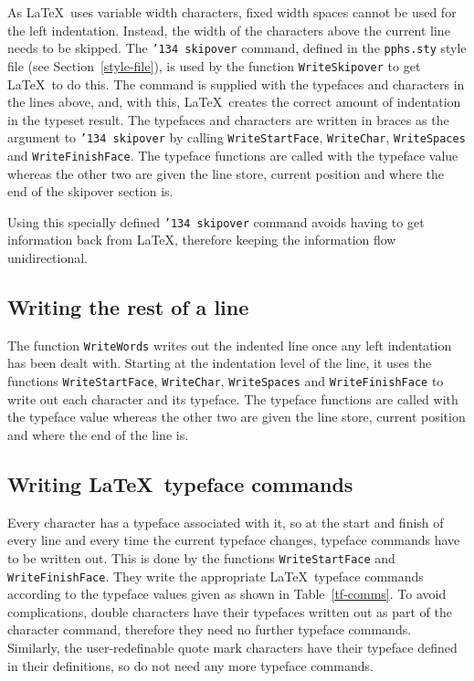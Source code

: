 As \LaTeX\ uses variable width characters, fixed width spaces cannot be used for the
left indentation.  Instead, the width of the characters above the current line needs
to be skipped.  The {\tt \char'134 skipover} command, defined in the {\tt pphs.sty}
style file (see Section~\ref{style-file}), is used by the function {\tt WriteSkipover}
to get \LaTeX\ to do this.  The command is supplied with the typefaces and characters
in the lines above, and, with this, \LaTeX\ creates the correct amount of
indentation in the typeset result.  The typefaces and characters are written in
braces as the argument to {\tt \char'134 skipover} by calling {\tt WriteStartFace},
{\tt WriteChar}, {\tt WriteSpaces} and {\tt WriteFinishFace}.  The typeface functions
are called with the typeface value whereas the other two are given the line store,
current position and where the end of the skipover section is.

Using this specially defined {\tt \char'134 skipover} command avoids having to get
information back from \LaTeX , therefore keeping the information flow unidirectional.

\subsection{Writing the rest of a line}

The function {\tt WriteWords} writes out the indented line once any left indentation
has been dealt with.  Starting at the indentation level of the line, it uses the functions
{\tt WriteStartFace}, {\tt WriteChar}, {\tt WriteSpaces} and {\tt WriteFinishFace} to
write out each character and its typeface.  The typeface functions are called with
the typeface value whereas the other two are given the line store, current position
and where the end of the line is.

\subsection{Writing \LaTeX\ typeface commands}

Every character has a typeface associated with it, so at the start and finish of every
line and every time the current typeface changes, typeface commands have to be written
out.  This is done by the functions {\tt WriteStartFace} and {\tt WriteFinishFace}.
They write the appropriate \LaTeX\ typeface commands according to the typeface values
given as shown in Table~\ref{tf-comms}.  To avoid complications, double characters have
their typefaces written out as part of the character command, therefore they need no
further typeface commands.  Similarly, the user-redefinable quote mark characters
have their typeface defined in their definitions, so do not need any more typeface
commands.

